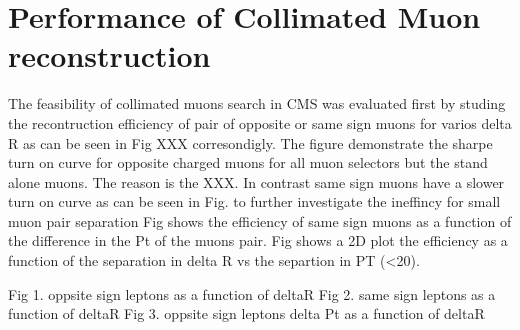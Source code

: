 \section{Performance of Collimated Muon reconstruction}
The feasibility of collimated muons search in CMS was evaluated first by studing the recontruction efficiency of
pair of opposite or same sign muons for varios delta R as can be seen in Fig XXX corresondigly.
The figure demonstrate the sharpe turn on curve for opposite charged muons for all  muon selectors but the stand alone muons. The reason is the XXX. 
In contrast same sign muons have a slower turn on curve as can be seen in Fig. to further investigate the ineffincy for small muon pair separation Fig shows the efficiency of same sign muons as a function of the difference in the Pt of the muons pair. Fig shows a 2D plot the efficiency as a function of the  separation in delta R vs the separtion in PT (<20).


Fig 1. oppsite sign leptons as a function of deltaR
Fig 2. same sign leptons as a function of deltaR
Fig 3. oppsite sign leptons delta Pt  as a function of deltaR




